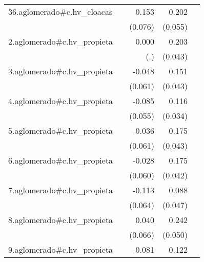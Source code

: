 {\begin{longtable}{l*{4}{D{.}{.}{-1}}}
\addlinespace
36.aglomerado#c.hv\_cloacas&                     &       0.153\sym{*}  &       0.202\sym{***}&                     \\
            &                     &     (0.076)         &     (0.055)         &                     \\
\addlinespace
2.aglomerado#c.hv\_propieta&                     &       0.000         &       0.203\sym{***}&                     \\
            &                     &         (.)         &     (0.043)         &                     \\
\addlinespace
3.aglomerado#c.hv\_propieta&                     &      -0.048         &       0.151\sym{***}&                     \\
            &                     &     (0.061)         &     (0.043)         &                     \\
\addlinespace
4.aglomerado#c.hv\_propieta&                     &      -0.085         &       0.116\sym{***}&                     \\
            &                     &     (0.055)         &     (0.034)         &                     \\
\addlinespace
5.aglomerado#c.hv\_propieta&                     &      -0.036         &       0.175\sym{***}&                     \\
            &                     &     (0.061)         &     (0.043)         &                     \\
\addlinespace
6.aglomerado#c.hv\_propieta&                     &      -0.028         &       0.175\sym{***}&                     \\
            &                     &     (0.060)         &     (0.042)         &                     \\
\addlinespace
7.aglomerado#c.hv\_propieta&                     &      -0.113         &       0.088         &                     \\
            &                     &     (0.064)         &     (0.047)         &                     \\
\addlinespace
8.aglomerado#c.hv\_propieta&                     &       0.040         &       0.242\sym{***}&                     \\
            &                     &     (0.066)         &     (0.050)         &                     \\
\addlinespace
9.aglomerado#c.hv\_propieta&                     &      -0.081         &       0.122\sym{*}  &                     \\

\end{longtable}}
